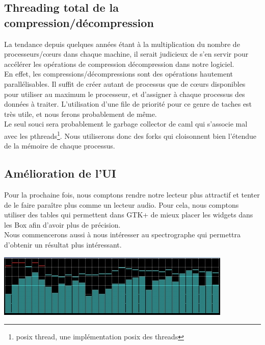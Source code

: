 \documentclass[a4paper,12pt]{article}
\begin{document}
\newpage

	\subsection{Threading total de la compression/décompression}
La tendance depuis quelques années étant à la multiplication du nombre de
processeurs/cœurs dans chaque machine, il serait judicieux de s'en servir pour
accélérer les opérations de compression décompression dans notre logiciel.\\
En
effet, les compressions/décompressions sont des opérations hautement
parallélisables. Il suffit de créer autant de processus que de cœurs
disponibles pour utiliser au maximum le processeur, et d'assigner à chaque
processus des données à traiter. L'utilisation d'une file de priorité
pour ce genre de taches est très utile, et nous ferons probablement de même.\\
Le seul souci sera probablement le garbage collector de caml qui s'associe mal
avec les pthreads\footnote{posix thread, une implémentation posix des threads}.
Nous utiliserons donc des forks qui cloisonnent bien
l'étendue de la mémoire de chaque processus.

	\subsection{Amélioration de l'UI}
Pour la prochaine fois, nous comptons
rendre notre lecteur plus attractif et tenter de le faire paraître plus comme un
lecteur audio. Pour cela, nous comptons utiliser des tables qui permettent dans
GTK+ de mieux placer les widgets dans les Box afin d'avoir plus de précision. \\
Nous commencerons aussi à nous intéresser au spectrographe qui permettra
d'obtenir un résultat plus intéressant.
\begin{center}
\includegraphics[scale=0.50]{img/spectre.png}
\end{center}

\newpage
\end{document}
